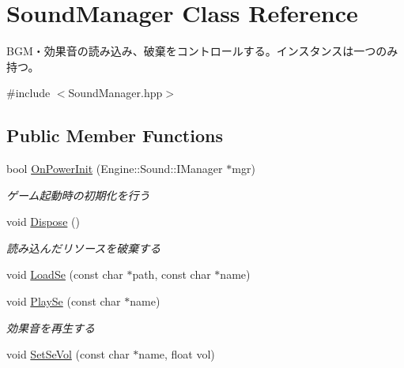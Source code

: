 \hypertarget{class_sound_manager}{}\section{Sound\+Manager Class Reference}
\label{class_sound_manager}


B\+G\+M・効果音の読み込み、破棄をコントロールする。インスタンスは一つのみ持つ。  




{\ttfamily \#include $<$Sound\+Manager.\+hpp$>$}

\subsection*{Public Member Functions}
\begin{DoxyCompactItemize}
\item 
bool \hyperlink{class_sound_manager_a826a69f197688c29747db3e3e6fccfd6}{On\+Power\+Init} (Engine\+::\+Sound\+::\+I\+Manager $\ast$mgr)\hypertarget{class_sound_manager_a826a69f197688c29747db3e3e6fccfd6}{}\label{class_sound_manager_a826a69f197688c29747db3e3e6fccfd6}

\begin{DoxyCompactList}\small\item\em ゲーム起動時の初期化を行う \end{DoxyCompactList}\item 
void \hyperlink{class_sound_manager_a5d6503973dd6c21ddc9cc28c5639a90c}{Dispose} ()\hypertarget{class_sound_manager_a5d6503973dd6c21ddc9cc28c5639a90c}{}\label{class_sound_manager_a5d6503973dd6c21ddc9cc28c5639a90c}

\begin{DoxyCompactList}\small\item\em 読み込んだリソースを破棄する \end{DoxyCompactList}\item 
void \hyperlink{class_sound_manager_a407accad9f868b7a46a48e45934cea5a}{Load\+Se} (const char $\ast$path, const char $\ast$name)
\item 
void \hyperlink{class_sound_manager_af768e0d4b39d800873424520129677af}{Play\+Se} (const char $\ast$name)\hypertarget{class_sound_manager_af768e0d4b39d800873424520129677af}{}\label{class_sound_manager_af768e0d4b39d800873424520129677af}

\begin{DoxyCompactList}\small\item\em 効果音を再生する \end{DoxyCompactList}\item 
void \hyperlink{class_sound_manager_a17ee381e92bfccb11a9d1a3e6196cf9c}{Set\+Se\+Vol} (const char $\ast$name, float vol)\hypertarget{class_sound_manager_a17ee381e92bfccb11a9d1a3e6196cf9c}{}\label{class_sound_manager_a17ee381e92bfccb11a9d1a3e6196cf9c}


\end{DoxyCompactItemize}
